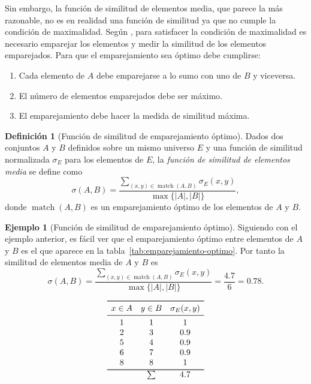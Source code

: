 \documentclass[a4paper,10pt,twoside]{article}
\theoremstyle{definition}
\newtheorem{definition}{Definición}
\newtheorem{example}{Ejemplo}
\begin{document}
Sin embargo, la función de similitud de elementos media, que parece la más razonable, no es en realidad una función de similitud ya que no cumple la condición de maximalidad. 
Según \cite{valtchev1997dissimilarity}, para satisfacer la condición de maximalidad es necesario emparejar los elementos y medir la similitud de los elementos emparejados.
Para que el emparejamiento sea óptimo debe cumplirse:
\begin{enumerate}[noitemsep,label=\emph{\alph*})]
\item Cada elemento de $A$ debe emparejarse a lo sumo con uno de $B$ y viceversa.
\item El número de elementos emparejados debe ser máximo.
\item El emparejamiento debe hacer la medida de similitud máxima. 
\end{enumerate}

\begin{definition}[Función de similitud de emparejamiento óptimo]
Dados dos conjuntos $A$ y $B$ definidos sobre un mismo universo $E$ y una función de similitud normalizada $\sigma_E$ para los elementos de $E$, 
la \emph{función de similitud de elementos media} se define como
\[
\sigma(A,B)=\frac{\sum_{(x,y)\in \operatorname{match}(A,B)} \sigma_E(x,y)}{\max\{|A|,|B|\}},
\]
donde $\operatorname{match}(A,B)$ es un emparejamiento óptimo de los elementos de $A$ y $B$.
\end{definition}

\begin{example}[Función de similitud de emparejamiento óptimo]
Siguiendo con el ejemplo anterior, es fácil ver que el emparejamiento óptimo entre elementos de $A$ y $B$ es el que aparece en la tabla~\ref{tab:emparejamiento-optimo}.
Por tanto la similitud de elementos media de $A$ y $B$ es
\[
\sigma(A,B)=\frac{\sum_{(x,y)\in \operatorname{match}(A,B)} \sigma_E(x,y)}{\max\{|A|,|B|\}} = \frac{4.7}{6}=0.78.
\]
\end{example}

\begin{table}[htbp!]
\caption{Emparejamiento óptimo de los elementos de los conjuntos $A$=\{1,2,5,6,8\} y $B$=\{1,3,4,7,8,9\} de acuerdo a la función de similitud $\sigma_E(x,y)=1-\frac{|x-y|}{10}$. \label{tab:emparejamiento-optimo}}
\[
\begin{array}{ccc}
\toprule
x\in A & y\in B & \sigma_E(x,y)\\
\midrule
1 & 1 & 1\\
2 & 3 & 0.9\\
5 & 4 & 0.9\\
6 & 7 & 0.9\\
8 & 8 & 1\\
\bottomrule
 & \sum & 4.7
\end{array}
\]
\end{table}
\end{document}
